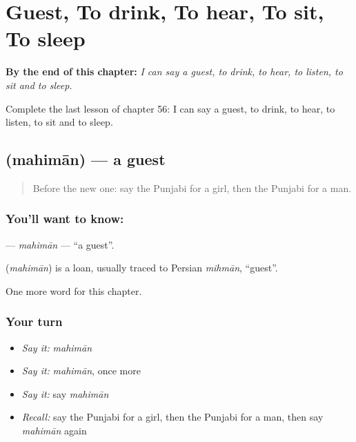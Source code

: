 
\chapter{Guest, To drink, To hear, To sit, To sleep}
\label{ch:pa-guest-to-drink-to-hear-to-sit-to-sleep}

\begin{chapteropening}
\textbf{By the end of this chapter:} \emph{I can say a guest, to drink, to hear, to listen, to sit and to sleep.}

Complete the last lesson of chapter 56: I can say a guest, to drink, to hear, to listen, to sit and to sleep.
\end{chapteropening}

\section[\texorpdfstring{\pa{ਮਹਿਮਾਨ} (mahimān)}{ਮਹਿਮਾਨ (mahimān)}]{ (mahimān) — a guest}

\label{lesson:PA-C56-mahiman}



\begin{quote}
Before the new one: say the Punjabi for a girl, then the Punjabi for a man.
\end{quote}

\subsection*{You'll want to know: }
\textbf{} — \emph{mahimān} — \textquotedblleft{}a guest\textquotedblright{}.

\begin{cousinweb}
\textbf{} (\emph{mahimān}) is a loan, usually traced to Persian \emph{mihmān}, \textquotedblleft{}guest\textquotedblright{}.
\end{cousinweb}

\begin{grammarlens}[title={What you've built}]
One more word for this chapter.
\end{grammarlens}

\subsection*{Your turn}
\begin{itemize}
\raggedright
  \item \emph{Say it:} \emph{mahimān}
  \item \emph{Say it:} \emph{mahimān}, once more
  \item \emph{Say it:} say \emph{mahimān}
  \item \emph{Recall:} say the Punjabi for a girl, then the Punjabi for a man, then say \emph{mahimān} again
\end{itemize}

